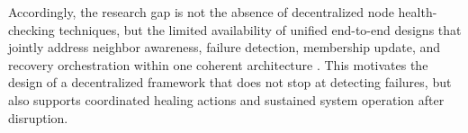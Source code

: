 Accordingly, the research gap is not the absence of decentralized node health-checking techniques, but the limited
availability of unified end-to-end designs that jointly address neighbor awareness, failure detection, membership
update, and recovery orchestration within one coherent architecture \cite{fuSystematicReviewFuture2025}.
This motivates the design of a decentralized framework that does not stop at detecting failures, but also supports
coordinated healing actions and sustained system operation after disruption.




